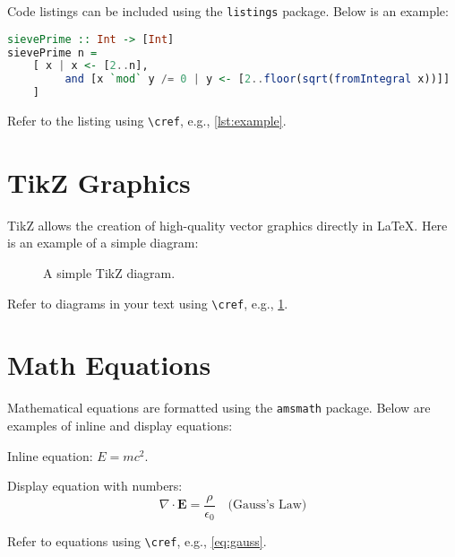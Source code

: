 Code listings can be included using the \texttt{listings} package. Below is an example:
\begin{lstlisting}[language=Haskell, caption={An example Haskell code listing.}, label={lst:example}]
sievePrime :: Int -> [Int]
sievePrime n = 
    [ x | x <- [2..n],
         and [x `mod` y /= 0 | y <- [2..floor(sqrt(fromIntegral x))]]
    ]
\end{lstlisting}
Refer to the listing using \texttt{\textbackslash cref}, e.g., \cref{lst:example}.

\section{TikZ Graphics}

TikZ allows the creation of high-quality vector graphics directly in LaTeX. Here is an example of a simple diagram:

\begin{figure}[h!]
    \centering
    \caption{A simple TikZ diagram.}
    \label{fig:tikz_example}
\end{figure}

Refer to diagrams in your text using \texttt{\textbackslash cref}, e.g., \cref{fig:tikz_example}.

\section{Math Equations}

Mathematical equations are formatted using the \texttt{amsmath} package. Below are examples of inline and display equations:

Inline equation: $E = mc^2$.

Display equation with numbers:
\begin{equation}
    \nabla \cdot \mathbf{E} = \frac{\rho}{\epsilon_0} \quad \text{(Gauss's Law)}
    \label{eq:gauss}
\end{equation}

Refer to equations using \texttt{\textbackslash cref}, e.g., \cref{eq:gauss}.

